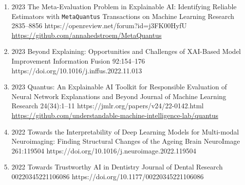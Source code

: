 {\begin{enumerate}
    \item {}
                        {2023}
                        {The Meta-Evaluation Problem in Explainable AI: Identifying Reliable Estimators with \texttt{MetaQuantus}}
                        {Transactions on Machine Learning Research}
                        {2835--8856}
                        {https://openreview.net/forum?id=j3FK00HyfU}
                        {\\\href{https://github.com/annahedstroem/MetaQuantus}{https://github.com/annahedstroem/MetaQuantus}}

    \item {}
                        {2023}
                        {Beyond Explaining: Opportunities and Challenges of XAI-Based Model Improvement}
                        {Information Fusion}
                        {92:154--176}
                        {https://doi.org/10.1016/j.inffus.2022.11.013}

    \item {}
                        {2023}
                        {Quantus: An Explainable AI Toolkit for Responsible Evaluation of Neural Network Explanations and Beyond}
                        {Journal of Machine Learning Research}
                        {24(34):1--11}
                        {https://jmlr.org/papers/v24/22-0142.html}
                        {\\\href{https://github.com/understandable-machine-intelligence-lab/quantus}{https://github.com/understandable-machine-intelligence-lab/quantus}}

    \item {}
                        {2022}
                        {Towards the Interpretability of Deep Learning Models for Multi-modal Neuroimaging: Finding Structural Changes of the Ageing Brain}
                        {NeuroImage}
                        {261:119504}
                        {https://doi.org/10.1016/j.neuroimage.2022.119504}


    \item {}
                        {2022}
                        {Towards Trustworthy AI in Dentistry}
                        {Journal of Dental Research}
                        {00220345221106086}
                        {https://doi.org/10.1177/00220345221106086}



\end{enumerate}}
